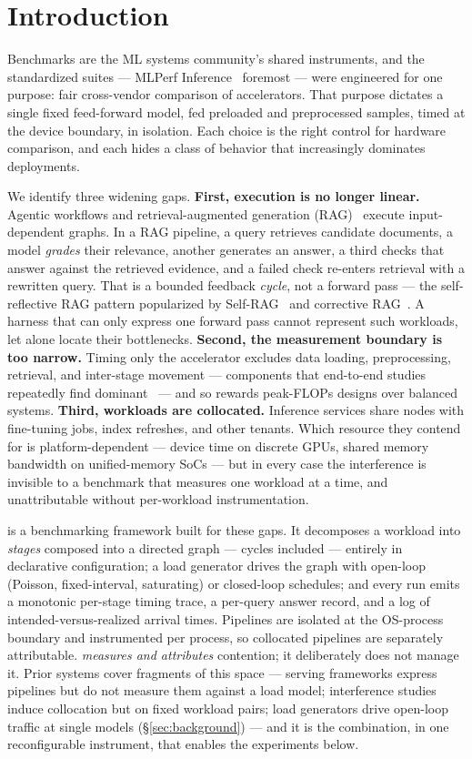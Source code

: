 \section{Introduction}
\label{sec:intro}

Benchmarks are the ML systems community's shared instruments, and the
standardized suites --- MLPerf Inference~\cite{reddi2020mlperf} foremost ---
were engineered for one purpose: fair cross-vendor comparison of
accelerators. That purpose dictates a single fixed feed-forward model, fed
preloaded and preprocessed samples, timed at the device boundary, in
isolation. Each choice is the right control for hardware comparison, and
each hides a class of behavior that increasingly dominates deployments.

We identify three widening gaps. \textbf{First, execution is no longer
linear.} Agentic workflows and retrieval-augmented generation
(RAG)~\cite{lewis2020rag} execute input-dependent graphs. In a RAG pipeline,
a query retrieves candidate documents, a model \emph{grades} their relevance,
another generates an answer, a third checks that answer against the retrieved
evidence, and a failed check re-enters retrieval with a rewritten query. That is a
bounded feedback \emph{cycle}, not a forward pass --- the self-reflective
RAG pattern popularized by Self-RAG~\cite{asai2024selfrag} and corrective
RAG~\cite{yan2024crag}. A harness that can only express one forward pass
cannot represent such workloads, let alone locate their bottlenecks.
\textbf{Second, the measurement boundary is too narrow.} Timing only the
accelerator excludes data loading, preprocessing, retrieval, and inter-stage
movement --- components that end-to-end studies repeatedly find
dominant~\cite{coleman2017dawnbench} --- and so rewards peak-FLOPs designs
over balanced systems. \textbf{Third, workloads are collocated.} Inference
services share nodes with fine-tuning jobs, index refreshes, and other
tenants. Which resource they contend for is platform-dependent --- device
time on discrete GPUs, shared memory bandwidth on unified-memory SoCs --- but
in every case the interference is invisible to a benchmark that measures one
workload at a time, and unattributable without per-workload instrumentation.

\sysname{} is a benchmarking framework built for these gaps. It decomposes a
workload into \emph{stages} composed into a directed graph --- cycles
included --- entirely in declarative configuration; a load generator drives
the graph with open-loop (Poisson, fixed-interval, saturating) or closed-loop
schedules; and every run emits a monotonic per-stage timing trace, a
per-query answer record, and a log of intended-versus-realized arrival times.
Pipelines are isolated at the OS-process boundary and instrumented per
process, so collocated pipelines are separately attributable. \sysname{}
\emph{measures and attributes} contention; it deliberately does not manage
it. Prior systems cover fragments of this space --- serving frameworks
express pipelines but do not measure them against a load model; interference
studies induce collocation but on fixed workload pairs; load generators
drive open-loop traffic at single models (\S\ref{sec:background}) --- and it
is the combination, in one reconfigurable instrument, that enables the
experiments below.

